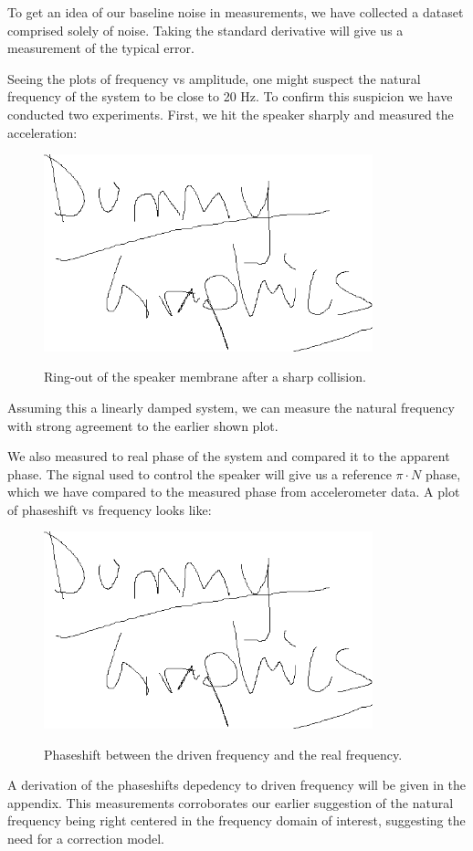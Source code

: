 \documentclass[12pt,oneside,a4paper]{article}
\numberwithin{equation}{section}
\begin{document}
{{{{To get an idea of our baseline noise in measurements, we have collected a dataset comprised solely of noise. Taking the standard derivative will give us a measurement of the typical error. 

Seeing the plots of frequency vs amplitude, one might suspect the natural frequency of the system to be close to 20 Hz. To confirm this suspicion we have conducted two experiments. First, we hit the speaker sharply and measured the acceleration: 
\begin{figure}[H]
\centering
\includegraphics[width=0.85\textwidth]{dummy.png} \label{nat_freq}
\caption{Ring-out of the speaker membrane after a sharp collision.}
\end{figure}
Assuming this a linearly damped system, we can measure the natural frequency with strong agreement to the earlier shown plot. 

We also measured to real phase of the system and compared it to the apparent phase. The signal used to control the speaker will give us a reference $\pi\cdot N$ phase, which we have compared to the measured phase from accelerometer data. A plot of phaseshift vs frequency looks like:
\begin{figure}[H]
\centering
\includegraphics[width=0.85\textwidth]{dummy.png} \label{phaseshift_plot}
\caption{Phaseshift between the driven frequency and the real frequency.}
\end{figure}
A derivation of the phaseshifts depedency to driven frequency will be given in the appendix. This measurements corroborates our earlier suggestion of the natural frequency being right centered in the frequency domain of interest, suggesting the need for a correction model. 
}}}}
\end{document}
